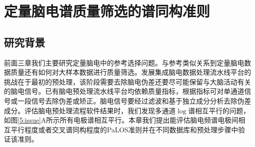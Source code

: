 \chapter{定量脑电谱质量筛选的谱同构准则}
\section{研究背景}
前面三章我们主要研究定量脑电中的参考选择问题。与参考类似关系到定量脑电数据质量还有如何对大样本数据进行质量筛选。发展集成脑电数据处理流水线平台的挑战在于最初的预处理，该阶段需要去除脑电伪差还要尽可能保留与大脑活动有关的脑电信号。已有脑电预处理流水线平台均依赖质量指标，根据指标可对单通道信号或一段信号去除伪差或矫正。脑电信号要经过滤波和基于独立成分分析去除伪差成分。评估脑电预处理流程软件结果时，我们发现多通道$\log$谱相互平行的问题，如图\ref{5:issue}A所示所有电极谱相互平行。本章我们提出能评估脑电频谱电极间相互平行程度或者交叉谱同构程度的PaLOS准则并在不同数据库和预处理步骤中验证该准则。

